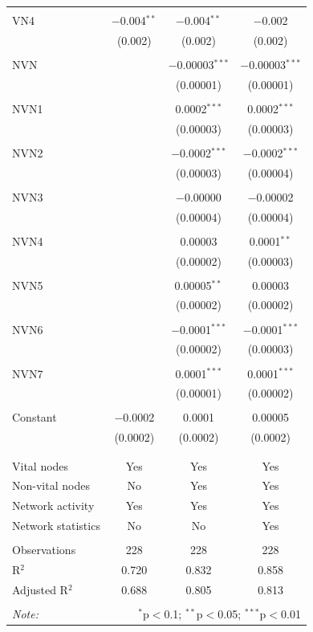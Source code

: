 \begin{table}[!htbp]
\begin{tabular}{@{\extracolsep{5pt}}lccc}
  & & & \\ 
 VN4 & $-$0.004$^{**}$ & $-$0.004$^{**}$ & $-$0.002 \\ 
  & (0.002) & (0.002) & (0.002) \\ 
  & & & \\ 
 NVN &  & $-$0.00003$^{***}$ & $-$0.00003$^{***}$ \\ 
  &  & (0.00001) & (0.00001) \\ 
  & & & \\ 
 NVN1 &  & 0.0002$^{***}$ & 0.0002$^{***}$ \\ 
  &  & (0.00003) & (0.00003) \\ 
  & & & \\ 
 NVN2 &  & $-$0.0002$^{***}$ & $-$0.0002$^{***}$ \\ 
  &  & (0.00003) & (0.00004) \\ 
  & & & \\ 
 NVN3 &  & $-$0.00000 & $-$0.00002 \\ 
  &  & (0.00004) & (0.00004) \\ 
  & & & \\ 
 NVN4 &  & 0.00003 & 0.0001$^{**}$ \\ 
  &  & (0.00002) & (0.00003) \\ 
  & & & \\ 
 NVN5 &  & 0.00005$^{**}$ & 0.00003 \\ 
  &  & (0.00002) & (0.00002) \\ 
  & & & \\ 
 NVN6 &  & $-$0.0001$^{***}$ & $-$0.0001$^{***}$ \\ 
  &  & (0.00002) & (0.00003) \\ 
  & & & \\ 
 NVN7 &  & 0.0001$^{***}$ & 0.0001$^{***}$ \\ 
  &  & (0.00001) & (0.00002) \\ 
  & & & \\ 
 Constant & $-$0.0002 & 0.0001 & 0.00005 \\ 
  & (0.0002) & (0.0002) & (0.0002) \\ 
  & & & \\ 
\hline \\[-1.8ex] 
Vital nodes & Yes & Yes & Yes \\ 
Non-vital nodes & No & Yes & Yes \\ 
Network activity & Yes & Yes & Yes \\ 
Network statistics & No & No & Yes \\ 
\hline &  &  &  \\ 
Observations & 228 & 228 & 228 \\ 
R$^{2}$ & 0.720 & 0.832 & 0.858 \\ 
Adjusted R$^{2}$ & 0.688 & 0.805 & 0.813 \\ 
\hline 
\hline \\[-1.8ex] 
\textit{Note:}  & \multicolumn{3}{r}{$^{*}$p$<$0.1; $^{**}$p$<$0.05; $^{***}$p$<$0.01} \\ 
\end{tabular} 
\end{table} 
